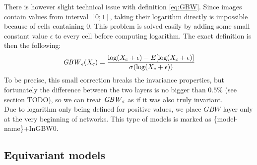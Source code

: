 There is however slight technical issue with definition \ref{eq:GBW}.
Since images contain values from interval $[0;1]$,
taking their logarithm directly is impossible because of
cells containing $0$. This problem is solved easily by adding some small constant value
$\epsilon$ to every cell before computing logarithm. The exact definition
is then the following:
\begin{equation}
\mathit{GBW}_{\epsilon}(X_c) =
    \frac{\log(X_c+\epsilon)-E[\log(X_c+\epsilon)]}{\sigma(\log(X_c+\epsilon))}
\end{equation}
To be precise, this small correction breaks the invariance properties,
but fortunately the difference between the two layers is no
bigger than $0.5\%$ (see section TODO), so we
can treat $\mathit{GBW}_{\epsilon}$ as if it was also truly invariant.
\\ Due to logarithm only being defined for positive values, we place
$\mathit{GBW}$ layer only at the very beginning of networks. This type of models
is marked as \{model-name\}+InGBW0.



\subsection{Equivariant models}
\label{sec:equ_models}


